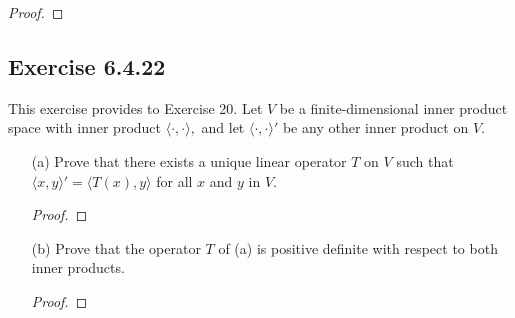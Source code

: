 \begin{proof}
\end{proof}

\subsection*{Exercise 6.4.22} This exercise provides to Exercise 20. Let \( V \) be a finite-dimensional inner product space with inner product \( \langle \cdot , \cdot \rangle, \) and let \( \langle \cdot , \cdot \rangle' \) be any other inner product on \( V  \).
\begin{enumerate}
    \item[(a)] Prove that there exists a unique linear operator \( T  \) on \( V  \) such that \( \langle x , y \rangle' = \langle T(x) , y \rangle  \) for all \( x  \) and \( y  \) in \( V  \). 
        \begin{proof}
        
        \end{proof}
    \item[(b)] Prove that the operator \( T  \) of (a) is positive definite with respect to both inner products.
        \begin{proof}
       
        \end{proof}
\end{enumerate}
